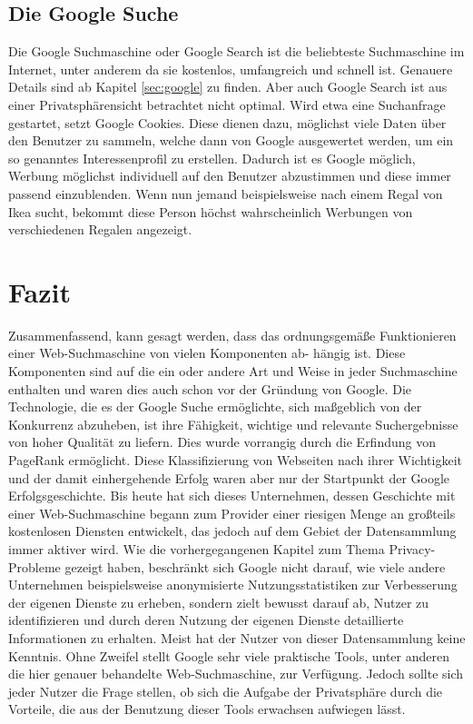 \documentclass[12pt, a4paper]{llncs}
\begin{document}
	\subsection{Die Google Suche}
	\label{sec:search}
	Die Google Suchmaschine oder Google Search ist die beliebteste Suchmaschine im Internet, unter anderem da sie kostenlos, umfangreich und schnell ist. Genauere Details sind ab Kapitel \ref{sec:google} zu finden. Aber auch Google Search ist aus einer Privatsphärensicht betrachtet nicht optimal. Wird etwa eine Suchanfrage gestartet, setzt Google Cookies. Diese dienen dazu, möglichst viele Daten über den Benutzer zu sammeln, welche dann von Google ausgewertet werden, um ein so genanntes Interessenprofil zu erstellen. Dadurch ist es Google möglich, Werbung möglichst individuell auf den Benutzer abzustimmen und diese immer passend einzublenden. Wenn nun jemand beispielsweise nach einem Regal von Ikea sucht, bekommt diese Person höchst wahrscheinlich Werbungen von verschiedenen Regalen angezeigt\cite{3}.

	\section{Fazit}
	Zusammenfassend, kann gesagt werden, dass das ordnungsgemäße Funktionieren einer Web-Suchmaschine von vielen Komponenten ab- hängig ist. Diese Komponenten
	sind auf die ein oder andere Art und Weise in jeder Suchmaschine enthalten und waren dies auch schon vor der Gründung von Google. Die Technologie, die es
	der Google Suche ermöglichte, sich maßgeblich von der Konkurrenz abzuheben, ist ihre Fähigkeit, wichtige und relevante Suchergebnisse von hoher Qualität zu 
	liefern. Dies wurde vorrangig durch die Erfindung von PageRank ermöglicht. Diese Klassifizierung von Webseiten nach ihrer Wichtigkeit und der damit einhergehende
	Erfolg waren aber nur der Startpunkt der Google Erfolgsgeschichte. Bis heute hat sich dieses Unternehmen, dessen Geschichte mit einer Web-Suchmaschine begann zum Provider einer riesigen Menge an großteils kostenlosen Diensten entwickelt, das jedoch auf dem Gebiet der Datensammlung immer aktiver wird. Wie die vorhergegangenen
	Kapitel zum Thema Privacy-Probleme gezeigt haben, beschränkt sich Google nicht darauf, wie viele andere Unternehmen beispielsweise anonymisierte Nutzungsstatistiken zur 
	Verbesserung der eigenen Dienste zu erheben, sondern zielt bewusst darauf ab, Nutzer zu identifizieren und durch deren Nutzung der eigenen Dienste detaillierte
	Informationen zu erhalten. Meist hat der Nutzer von dieser Datensammlung keine Kenntnis.
	Ohne Zweifel stellt Google sehr viele praktische Tools, unter anderen die hier genauer behandelte Web-Suchmaschine, zur Verfügung. Jedoch sollte sich jeder Nutzer die
	Frage stellen, ob sich die Aufgabe der Privatsphäre durch die Vorteile, die aus der Benutzung dieser Tools erwachsen aufwiegen lässt.
	\nocite{gadermayr14}
	\nocite{kutil02}	
	\nocite{acm15}
	\printbibliography[title={Bibliographie}]
	
\end{document}
